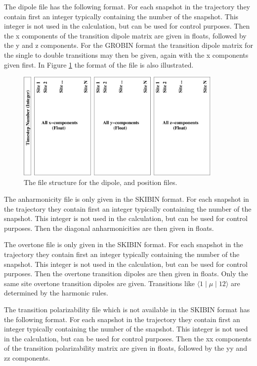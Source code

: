 The dipole file has the following format.
For each snapshot in the trajectory they contain first an integer typically containing the number of the snapshot. This integer is not used in the calculation, but can be used for control purposes.
Then the x components of the transition dipole matrix are given in floats, followed by the y and z components. For the GROBIN format the transition dipole matrix for the single to double transitions may then be given, again with the x components given first. In Figure \ref{fig:filestructure} the format of the file is also illustrated.
\begin{figure}[h!]
\begin{center}
\includegraphics[width=10cm]{file_structure.pdf}
\end{center}
\caption{\label{fig:filestructure}The file structure for the dipole, and position files.}
\end{figure}

The anharmonicity file is only given in the SKIBIN format.
For each snapshot in the trajectory they contain first an integer typically containing the number of the snapshot. This integer is not used in the calculation, but can be used for control purposes.
Then the diagonal anharmonicities are then given in floats.

The overtone file is only given in the SKIBIN format.
For each snapshot in the trajectory they contain first an integer typically containing the number of the snapshot. This integer is not used in the calculation, but can be used for control purposes.
Then the overtone transition dipoles are then given in floats. Only the same site overtone transition dipoles are given. Transitions like $\langle 1\mid\mu\mid 12\rangle$ are determined by the harmonic rules.

The transition polarizability file which is not available in the SKIBIN format 
has the following format. For each snapshot in the trajectory they contain first an integer 
typically containing the number of the snapshot. This integer is not used in the calculation, 
but can be used for control purposes. Then the xx components of the transition polarizability
matrix are given in floats, followed by the yy and zz components. 


